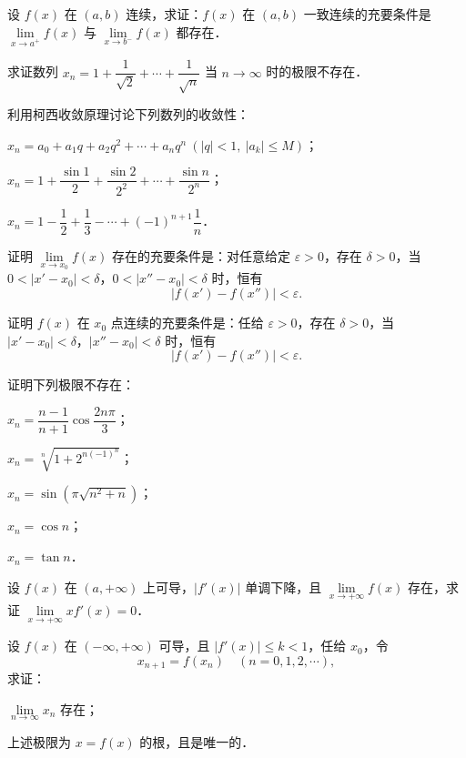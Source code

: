 \begin{xiti}
\item 设 $f(x)$ 在 $(a, b)$ 连续，求证：$f(x)$ 在 $(a, b)$ 一致连续的充要条件是 $\lim\limits_{x \to a^+} f(x)$ 与 $\lim\limits_{x \to b^-} f(x)$ 都存在．
\item 求证数列 $x_n = 1 + \dfrac{1}{\sqrt{2}} + \cdots + \dfrac{1}{\sqrt{n}}$ 当 $n \to \infty$ 时的极限不存在．
\item 利用柯西收敛原理讨论下列数列的收敛性：
\begin{ziti}
\item $x_n = a_0 + a_1 q + a_2 q^2 + \cdots + a_n q^n \ (\lvert q \rvert < 1, \ |a_k| \leqslant M)$；
\item $x_n = 1 + \dfrac{\sin 1}{2} + \dfrac{\sin 2}{2^2} + \cdots + \dfrac{\sin n}{2^n}$；
\item $x_n = 1 - \dfrac{1}{2} + \dfrac{1}{3} - \cdots + (-1)^{n+1} \dfrac{1}{n}$．
\end{ziti}
\item 证明 $\lim\limits_{x \to x_0} f(x)$ 存在的充要条件是：对任意给定 $\varepsilon > 0$，存在 $\delta > 0$，当 $0 < |x' - x_0| < \delta$，$0 < |x'' - x_0| < \delta$ 时，恒有
\[
|f(x') - f(x'')| < \varepsilon.
\]
\item 证明 $f(x)$ 在 $x_0$ 点连续的充要条件是：任给 $\varepsilon > 0$，存在 $\delta > 0$，当 $|x' - x_0| < \delta$，$|x'' - x_0| < \delta$ 时，恒有
\[
|f(x') - f(x'')| < \varepsilon.
\]
\item 证明下列极限不存在：
\begin{ziti}
\item $x_n = \dfrac{n-1}{n+1} \cos \dfrac{2n\pi}{3}$；
\item $x_n = \sqrt[n]{1 + 2^{n(-1)^n}}$；
\item $x_n = \sin \left( \pi \sqrt{n^2 + n} \right)$；
\item $x_n = \cos n$；
\item $x_n = \tan n$．
\end{ziti}
\item 设 $f(x)$ 在 $(a, +\infty)$ 上可导，$|f'(x)|$ 单调下降，且 $\lim\limits_{x \to +\infty} f(x)$ 存在，求证 $\lim\limits_{x \to +\infty} x f'(x) = 0$．
\item 设 $f(x)$ 在 $(-\infty, +\infty)$ 可导，且 $|f'(x)| \leqslant k < 1$，任给 $x_0$，令
\[
x_{n+1} = f(x_n) \quad (n = 0, 1, 2, \cdots),
\]
求证：
\begin{ziti}
\item $\lim\limits_{n \to \infty} x_n$ 存在；
\item 上述极限为 $x = f(x)$ 的根，且是唯一的．

\end{ziti}
\end{xiti}
